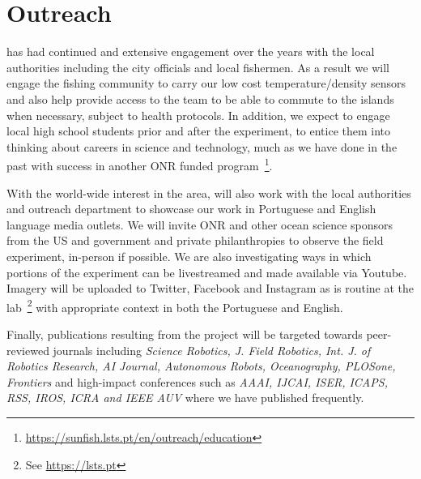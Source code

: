 \section{Outreach}

\inst has had continued and extensive engagement over the years with the
local authorities including the \naz city officials and local fishermen.
As a result we will engage the fishing community to carry our low cost
temperature/density sensors and also help provide access to the team to
be able to commute to the islands when necessary, subject to health
protocols. In addition, we expect to engage local high school students
prior and after the experiment, to entice them into thinking about
careers in science and technology, much as we have done in the past with
success in another ONR funded
program~\footnote{\url{https://sunfish.lsts.pt/en/outreach/education}}.

With the world-wide interest in the \naz area, \proj will also work
with the local authorities and \univ outreach department to showcase
our work in Portuguese and English language media outlets. We will
invite ONR and other ocean science sponsors from the US and government
and private philanthropies to observe the field experiment, in-person
if possible. We are also investigating ways in which portions of the
experiment can be livestreamed and made available via Youtube. Imagery
will be uploaded to Twitter, Facebook and Instagram as is routine at
the \ls lab~\footnote{See \url{https://lsts.pt}} with appropriate
context in both the Portuguese and English.

Finally, publications resulting from the project will be targeted
towards peer-reviewed journals including \emph{Science Robotics,
  J. Field Robotics, Int. J. of Robotics Research, AI Journal,
  Autonomous Robots, Oceanography, PLOSone, Frontiers} and high-impact
conferences such as \emph{AAAI, IJCAI, ISER, ICAPS, RSS, IROS, ICRA
  and IEEE AUV} where we have published frequently.

